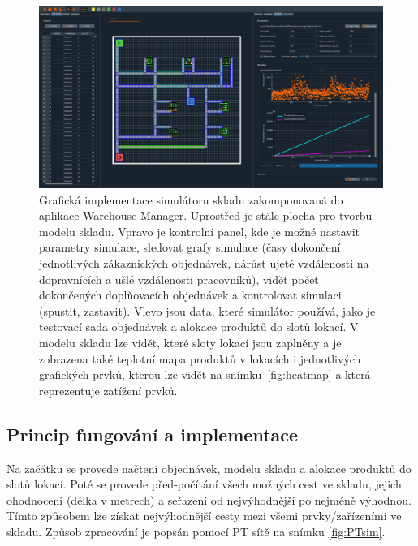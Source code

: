 \begin{figure}[t]
    \centering
    \includegraphics[width=0.99\linewidth]{figures/implementace/WarehouseManagerSim.png}
    \caption{Grafická implementace simulátoru skladu zakomponovaná do aplikace Warehouse Manager. Uprostřed je stále plocha pro tvorbu modelu skladu. Vpravo je kontrolní panel, kde je možné nastavit parametry simulace, sledovat grafy simulace (časy dokončení jednotlivých zákaznických objednávek, nárůst ujeté vzdálenosti na dopravnících a ušlé vzdálenosti pracovníků), vidět počet dokončených doplňovacích objednávek a kontrolovat simulaci (spustit, zastavit). Vlevo jsou data, které simulátor používá, jako je testovací sada objednávek a alokace produktů do slotů lokací. V modelu skladu lze vidět, které sloty lokací jsou zaplněny a je zobrazena také teplotní mapa produktů v lokacích i jednotlivých grafických prvků, kterou lze vidět na snímku~\ref{fig:heatmap} a která reprezentuje zatížení prvků.}
    \label{fig:UI_simulator}
\end{figure}

\subsection{Princip fungování a implementace}
Na začátku se provede načtení objednávek, modelu skladu a alokace produktů do slotů lokací. Poté se provede před-počítání všech možných cest ve skladu, jejich ohodnocení (délka v metrech) a seřazení od nejvýhodnější po nejméně výhodnou. Tímto způsobem lze získat nejvýhodnější cesty mezi všemi prvky/zařízeními ve skladu. Způsob zpracování je popsán pomocí PT sítě na snímku \ref{fig:PTsim}.

